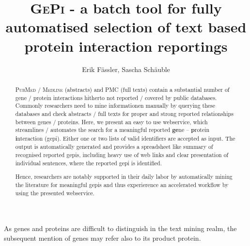 \documentclass[a4paper,10pt]{article}
\title{\textsc{GePi} - a batch tool for fully automatised selection of text based protein interaction reportings}
\author{Erik F\"assler, Sascha Sch\"auble}
\affil{JULIE Lab, FSU Jena}
\begin{document}
  \maketitle
  
  \begin{abstract}
    \textsc{PubMed} / \textsc{Medline} (abstracts) and \textsc{PMC} (full texts) contain a substantial number of gene / protein interactions hitherto not reported / covered by public databases. Commonly researchers need to mine informationen manually by querying these databases and check abstracts / full texts for proper and strong reported relationships between genes / proteins. Here, we present an easy to use webservice, which streamlines / automates the search for a meaningful reported \textbf{ge}ne -- \textbf{p}rotein \textbf{i}nteraction (gepi). Either one or two lists of valid identifiers are accepted as input. The output is automatically generated and provides a spreadsheet like summary of recognised reported gepis, including heavy use of web links and clear presentation of individual sentences, where the reported gepi is identified.
    
    Hence, researchers are notably supported in their daily labor by automatically mining the literature for meaningful gepis and thus experierence an accelerated workflow by using the presented webservice.
  \end{abstract}
  
  \newpage
  \tableofcontents
  \newpage
  
  As genes and proteins are difficult to distinguish in the text mining realm, the subsequent 
mention of genes may refer also to its product protein. 
  
\end{document}
